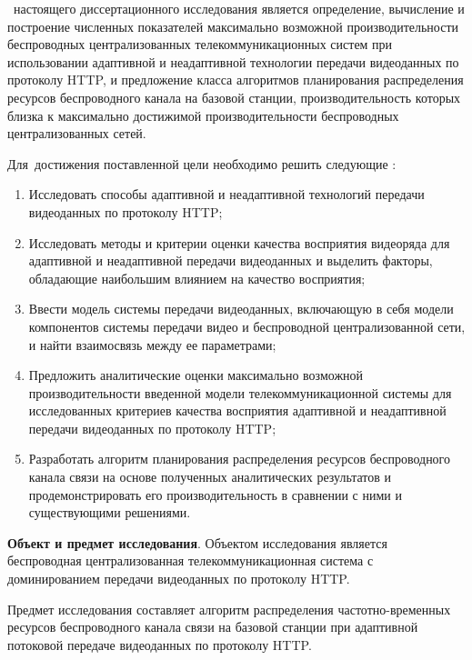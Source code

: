 \aim\ настоящего диссертационного исследования является определение, вычисление и построение численных показателей максимально возможной производительности беспроводных централизованных телекоммуникационных систем при использовании адаптивной и неадаптивной технологии передачи видеоданных по протоколу HTTP, и предложение класса алгоритмов планирования распределения ресурсов беспроводного канала на базовой станции, производительность которых близка к максимально достижимой производительности беспроводных централизованных сетей.

Для~достижения поставленной цели необходимо решить следующие {\tasks}:
\begin{enumerate}
    \item Исследовать способы адаптивной и неадаптивной технологий передачи видеоданных по протоколу HTTP;
    \item Исследовать методы и критерии оценки качества восприятия видеоряда для адаптивной и неадаптивной передачи видеоданных и выделить факторы, обладающие наибольшим влиянием на качество восприятия;
    \item Ввести модель системы передачи видеоданных, включающую в себя модели компонентов системы передачи видео и беспроводной централизованной сети, и найти взаимосвязь между ее параметрами;
    \item Предложить аналитические оценки максимально возможной производительности введенной модели телекоммуникационной системы для исследованных критериев качества восприятия адаптивной и неадаптивной передачи видеоданных по протоколу HTTP;
    \item Разработать алгоритм планирования распределения ресурсов беспроводного канала связи на основе полученных аналитических результатов и продемонстрировать его производительность в сравнении с ними и существующими решениями.
\end{enumerate}

\textbf{Объект и предмет исследования}. Объектом исследования является беспроводная централизованная телекоммуникационная система с доминированием передачи видеоданных по протоколу HTTP.

Предмет исследования составляет алгоритм распределения частотно-временных ресурсов беспроводного канала связи на базовой станции при адаптивной потоковой передаче видеоданных по протоколу HTTP.

